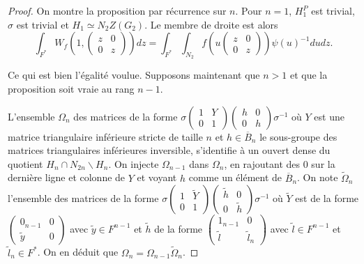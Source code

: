 \documentclass{amsart}
\begin{document}
\begin{proof}
On montre la proposition par récurrence sur $n$. Pour $n=1$, $H^P_1$ est trivial, $\sigma$ est trivial et $H_1 \simeq N_2 Z(G_2)$. Le membre de droite est alors
\begin{equation}
\int_{F^*} W_f \left(1, \begin{pmatrix}
z & 0 \\
0 & z
\end{pmatrix} \right) dz = \int_{F^*} \int_{N_2} f \left(u\begin{pmatrix}
z & 0 \\
0 & z
\end{pmatrix} \right) \psi(u)^{-1} du dz.
\end{equation}

Ce qui est bien l'égalité voulue. Supposons maintenant que $n > 1$ et que la proposition soit vraie au rang $n-1$.

L'ensemble $\Omega_n$ des matrices de la forme
$\sigma \begin{pmatrix}
1 & Y \\
0 & 1
\end{pmatrix}\begin{pmatrix}
h & 0 \\
0 & h
\end{pmatrix} \sigma^{-1}$ où $Y$ est une matrice triangulaire inférieure stricte de taille $n$ et $h \in \overline{B}_n$ le sous-groupe des matrices triangulaires inférieures inversible, s'identifie à un ouvert dense du quotient $H_n \cap N_{2n} \backslash{H_n}$. On injecte $\Omega_{n-1}$ dans $\Omega_n$, en rajoutant des 0 sur la dernière ligne et colonne de $Y$ et voyant $h$ comme un élément de $\overline{B}_n$. On note $\widetilde{\Omega}_n$ l'ensemble des matrices de la
forme $\sigma \begin{pmatrix}
1 & \widetilde{Y} \\
0 & 1
\end{pmatrix}\begin{pmatrix}
\widetilde{h} & 0 \\
0 & \widetilde{h}
\end{pmatrix} \sigma^{-1}$
où $\widetilde{Y}$ est de la forme $\begin{pmatrix}
0_{n-1} & 0 \\
\widetilde{y} & 0
\end{pmatrix}$ avec $\widetilde{y} \in F^{n-1}$ et $\widetilde{h}$ de la forme $\begin{pmatrix}
1_{n-1} & 0 \\
\widetilde{l} & \widetilde{l}_n
\end{pmatrix}$ avec $\widetilde{l} \in F^{n-1}$ et $\widetilde{l}_n \in F^*$. On en déduit que $\Omega_n = \Omega_{n-1} \widetilde{\Omega}_n$. 


\end{proof}
\end{document}
